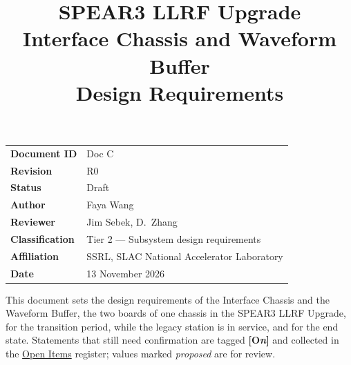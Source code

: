 \documentclass[letterpaper,11pt]{article}
\title{\vspace{-1.4cm}\bfseries SPEAR3 LLRF Upgrade\\[2mm]
       \Large Interface Chassis and Waveform Buffer\\ Design Requirements}
\author{}
\date{}
\newcommand{\openitemlegend}{\textcolor{cPlc}{\bfseries\scriptsize[O\textit{n}]}}
\begin{document}
\maketitle
\thispagestyle{plain}

\begin{center}
\begin{minipage}{0.86\linewidth}\small
\begin{tabular}{@{}ll@{}}
\textbf{Document ID}    & Doc C \\
\textbf{Revision}       & R0 \\
\textbf{Status}         & Draft \\
\textbf{Author}         & Faya Wang \\
\textbf{Reviewer}       & Jim Sebek, D.~Zhang \\
\textbf{Classification} & Tier 2 --- Subsystem design requirements \\
\textbf{Affiliation}    & SSRL, SLAC National Accelerator Laboratory \\
\textbf{Date}           & 13 November 2026 \\
\end{tabular}
\end{minipage}
\end{center}

\vspace{4mm}
\begin{keynote}
This document sets the design requirements of the Interface Chassis and the Waveform
Buffer, the two boards of one chassis in the SPEAR3 LLRF Upgrade, for the transition
period, while the legacy station is in service, and for the end state. Statements that
still need confirmation are tagged \openitemlegend{} and collected in the
\hyperref[sec:open-items]{Open Items} register; values marked \emph{proposed} are for
review.
\end{keynote}

\clearpage
\enlargethispage{2\baselineskip}
\tableofcontents
\listoffigures
\clearpage


\end{document}
